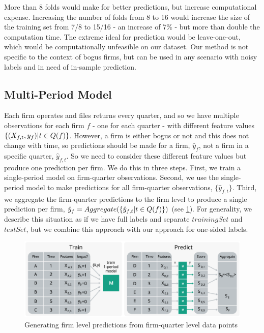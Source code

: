 More than 8 folds would make for better predictions, but increase computational expense. Increasing the number of folds from 8 to 16 would increase the size of the training set from 7/8 to 15/16 - an increase of 7\% - but more than double the computation time. The extreme ideal for prediction would be leave-one-out, which would be computationally unfeasible on our dataset. Our method is not specific to the context of bogus firms, but can be used in any scenario with noisy labels and in need of in-sample prediction. 

\subsection{Multi-Period Model}
\label{subsec:multi-period}
Each firm operates and files returns every quarter, and so we have multiple observations for each firm $f$ - one for each quarter - with different feature values $\{(X_{f,t},y_f)\space | \space t \in Q(f)\}$. However, a firm is either bogus or not and this does not change with time, so predictions should be made for a firm, $\hat{y}_f$, not a firm in a specific quarter, $\hat{y}_{f,t}$. So we need to consider these different feature values but produce one prediction per firm. We do this in three steps. First, we train a single-period model on firm-quarter observations. Second, we use the single-period model to make predictions for all firm-quarter observations, $\{\hat{y}_{f,t}\}$. Third, we aggregate the firm-quarter predictions to the firm level to produce a single prediction per firm, $\hat{y}_f=Aggregate(\{\hat{y}_{f,t}\space|t \in Q(f)\})$ (see \cref{fig:aggregation}). For generality, we describe this situation as if we have full labels and separate $trainingSet$ and $testSet$, but we combine this approach with our approach for one-sided labels.

\begin{figure}
  \includegraphics[width=1\columnwidth]{figures/MultiplePeriodPrediction.png}
  \caption{Generating firm level predictions from firm-quarter level data points}
  \label{fig:aggregation}
\end{figure}

